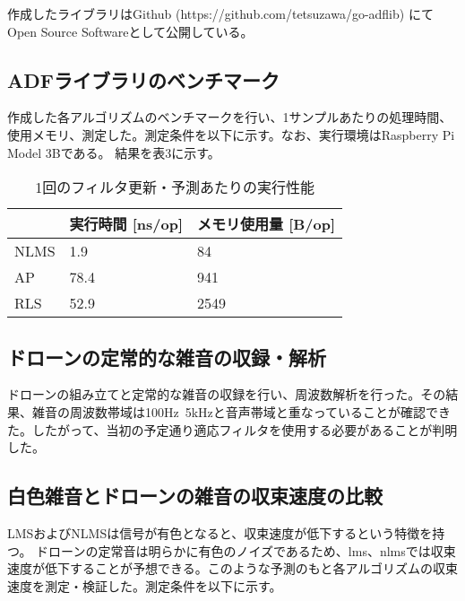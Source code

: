 \documentclass[a4paper, twocolumn]{ltjsarticle}
\begin{document}
    作成したライブラリはGithub (https://github.com/tetsuzawa/go-adflib) にてOpen Source Softwareとして公開している。

  \subsection{ADFライブラリのベンチマーク}
    作成した各アルゴリズムのベンチマークを行い、1サンプルあたりの処理時間、使用メモリ、測定した。測定条件を以下に示す。なお、実行環境はRaspberry Pi Model 3Bである。
    結果を表3に示す。

    \begin{table}[]
      \centering
      \caption{1回のフィルタ更新・予測あたりの実行性能}
      \label{tab:exec}
      \begin{tabular}{|l|l|l|}
      \hline
           & 実行時間 [ns/op] & メモリ使用量 [B/op] \\ \hline
      NLMS & 1.9          & 84            \\ \hline
      AP   & 78.4         & 941           \\ \hline
      RLS  & 52.9         & 2549          \\ \hline
      \end{tabular}
      \end{table}


  \subsection{ドローンの定常的な雑音の収録・解析}
    ドローンの組み立てと定常的な雑音の収録を行い、周波数解析を行った。その結果、雑音の周波数帯域は100Hz~5kHzと音声帯域と重なっていることが確認できた。したがって、当初の予定通り適応フィルタを使用する必要があることが判明した。

  \subsection{白色雑音とドローンの雑音の収束速度の比較}
    LMSおよびNLMSは信号が有色となると、収束速度が低下するという特徴を持つ。
    ドローンの定常音は明らかに有色のノイズであるため、lms、nlmsでは収束速度が低下することが予想できる。このような予測のもと各アルゴリズムの収束速度を測定・検証した。測定条件を以下に示す。
\end{document}
